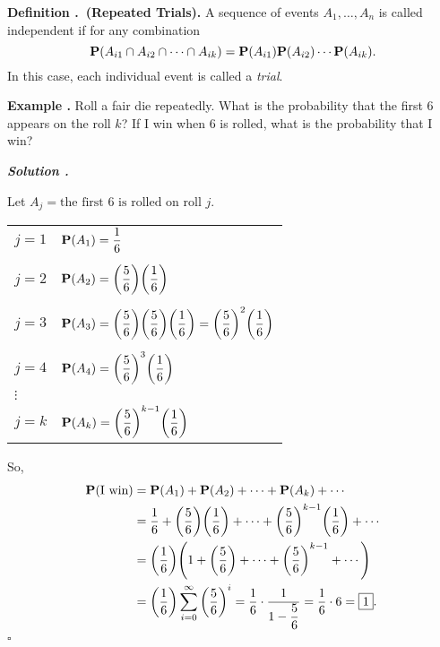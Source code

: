 \documentclass[12pt, a4paper]{article}
\newcounter{index}[subsection]
\newenvironment*{df}[1]{\par\noindent\textbf{Definition \thesubsection.\stepcounter{index}\theindex\ (#1).}}{\par}
\newenvironment*{eg}{\begin{framed}\par\noindent\textbf{Example \thesubsection.\stepcounter{index}\theindex}}{\par\end{framed}}
\newcounter{nprf}[subsection]
\newenvironment*{sol}{\par\indent\textbf{\textit{Solution \stepcounter{nprf}\thenprf.}}\par}{\hfill{$\square$}\par}
\def\P{\vb{P}}
\begin{document}
\begin{df}{Repeated Trials}
	A sequence of events $A_1,\dots,A_n$ is called independent if for any combination \[\P(A_{i1}\cap A_{i2}\cap\cdots\cap A_{ik})=\P(A_{i1})\P(A_{i2})\cdots \P(A_{ik}).\] In this case, each individual event is  called a \textit{trial}.
\end{df}
\begin{eg}{}
	Roll a fair die repeatedly. What is the probability that the first $6$ appears on the roll $k$? If I win when $6$ is rolled, what is the probability that I win? 
	\begin{sol}
		Let $A_j=\text{the first }6\text{ is rolled on roll }j$.
		\begin{center}\begin{tabular}{ll}
		$j=1$&$\P(A_1)=\dfrac{1}{6}$\\\\
		$j=2$&$\P(A_2)=\qty(\dfrac{5}{6})\qty(\dfrac{1}{6})$\\\\
		$j=3$&$\P(A_3)=\qty(\dfrac{5}{6})\qty(\dfrac{5}{6})\qty(\dfrac{1}{6})=\qty(\dfrac{5}{6})^2\qty(\dfrac{1}{6})$\\\\
		$j=4$&$\P(A_4)=\qty(\dfrac{5}{6})^3\qty(\dfrac{1}{6})$\\
		$\vdots$&\\
		$j=k$&$\P(A_k)=\qty(\dfrac{5}{6})^{k-1}\qty(\dfrac{1}{6})$
		\end{tabular}\end{center}
		So, \[\begin{aligned}\P(\text{I win})&=\P(A_1)+\P(A_2)+\cdots+\P(A_k)+\cdots\\&=\dfrac{1}{6}+\qty(\dfrac{5}{6})\qty(\dfrac{1}{6})+\cdots+\qty(\dfrac{5}{6})^{k-1}\qty(\dfrac{1}{6})+\cdots\\&=\qty(\dfrac{1}{6})\qty(1+\qty(\dfrac{5}{6})+\cdots+\qty(\dfrac{5}{6})^{k-1}+\cdots)\\&=\qty(\dfrac{1}{6})\sum_{i=0}^\infty\qty(\dfrac{5}{6})^i=\dfrac{1}{6}\cdot\dfrac{1}{1-\dfrac{5}{6}}=\dfrac{1}{6}\cdot6=\boxed{1}.\end{aligned}\]
	\end{sol}
\end{eg}
\end{document}
